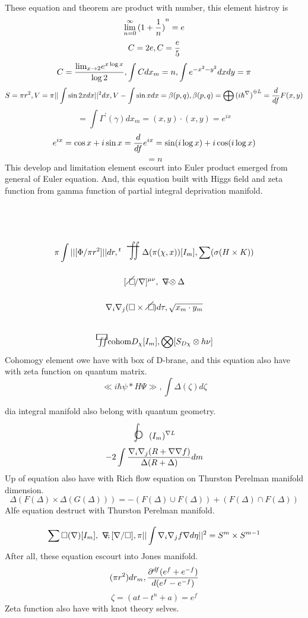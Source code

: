\documentclass{jsarticle}
\begin{document}
	These equation and theorem are product with number,
	this element histroy is
	$$ \lim_{n=0}^{\infty}{(1 + {1 \over n})}^{n} = e $$
	$$ C = 2e, C = {e \over 5} $$
	$$ C = {{\lim_{x\to 2}}e^{x\log x} \over \log 2}, \int C dx_m = n, 
	 \int e^{-x^2 - y^2}dxdy = \pi $$
	$$ S = \pi r^2, V = \pi ||\int \sin 2x dx||^{2}dx, 
	 V - \int \sin x dx = \beta(p,q), \beta(p,q) = \bigoplus
	{(i \hbar^{\nabla})}^{\oplus L} = {d \over {d f}}F(x,y) $$
	$$ = \int \Gamma^{'}(\gamma)dx_m 
          = (x,y)\cdot (x,y) = e^{ix} $$
	$$ e^{ix} = \cos x + i \sin x 
	 = {d \over {d f}}e^{ix} = \sin(i\log x) + i\cos(i\log x) $$
	$$ = n $$
	This develop and limitation element escourt into Euler product 
	emerged from general of Euler equation.
	And, this equation built with Higgs field and zeta function
	from gamma function of partial integral deprivation manifold.

	$$ \pi \int ||[\Phi / \pi r^2]||dr, {}^{t}\scalebox{1.0}[2]{
		\variint} \Delta(\pi(\chi,x))[I_m], 
		 \sum(\sigma(H \times K)) $$
		$$ [\alearletter / \nabla]^{\mu\nu}, 
         \secproduct \otimes \Delta $$
	$$ \nabla_{i}\nabla_{j}(\square \times \alearletter)d\tau, 
	 \sqrt{x_m\cdot y_m} $$
	$$ \squareiint \mathrm{cohom}D_{\chi}[I_m],
	\bigotimes [S_{D\chi} \otimes h\nu] $$
	Cohomogy element owe have with box of D-brane,
	and this equation also have with zeta function on quantum matrix.
	$$ \ll i\hbar \psi \ast H\Psi \gg, 
	 \int \Delta(\zeta)d\zeta $$

	 dia integral manifold also belong with quantum geometry.
	$$ \whitewithbodercircleint (I_m)^{\nabla L} $$
	$$ -2\int{{\nabla_{i}\nabla_{j} (R + \nabla\nabla f)} \over
	{\Delta(R + \Delta)}}dm $$
	Up of equation also have with Rich flow equation on Thurston
	Perelman manifold dimension.
	$$ \Delta(F(\Delta) \times \Delta(G(\Delta))) = - (F(\Delta) \cup
	F(\Delta)) + (F(\Delta) \cap F(\Delta)) $$
	Alfe equation destruct with Thurston Perelman manifold.
	$$ \sum \square(\nabla)[I_m], \secproduct,[\nabla / \square],
	\pi ||\int \nabla_{i}\nabla_{j} f \nabla d \eta||^2 = S^{m}
	\times S^{m-1} $$
	After all, these equation escourt into Jones manifold.
	$$ (\pi r^2) dr_m, {{\partial^{df} (e^{f} + e^{-f})} \over {
		d(e^{f} - e^{-f})}} $$
	$$ \zeta = (at -t^n + a) = e^{f} $$
	Zeta function also have with knot theory selves.
\end{document}
